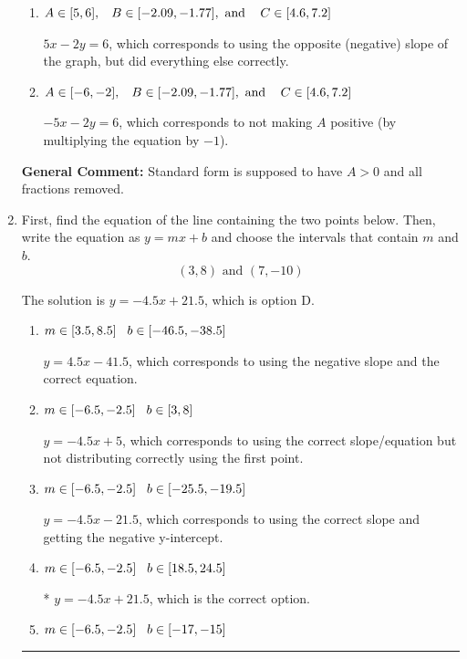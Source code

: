 \documentclass{extbook}[14pt]
\newcommand{\litem}[1]{\item #1

\rule{\textwidth}{0.4pt}}
\begin{document}
\begin{enumerate}
{\begin{enumerate}[label=\Alph*.]
* $5x + 2y = -6$, which is the correct option.
\item \( A \in [5, 6], \hspace{3mm} B \in [-2.09, -1.77], \text{ and } \hspace{3mm} C \in [4.6, 7.2] \)

 $5x - 2y = 6$, which corresponds to using the opposite (negative) slope of the graph, but did everything else correctly.
\item \( A \in [-6, -2], \hspace{3mm} B \in [-2.09, -1.77], \text{ and } \hspace{3mm} C \in [4.6, 7.2] \)

 $-5x - 2y = 6$, which corresponds to not making $A$ positive (by multiplying the equation by $-1$).
\end{enumerate}

\textbf{General Comment:} Standard form is supposed to have $A > 0$ and all fractions removed.
}
\litem{
First, find the equation of the line containing the two points below. Then, write the equation as $ y=mx+b $ and choose the intervals that contain $m$ and $b$.
\[ (3, 8) \text{ and } (7, -10) \]

The solution is \( y = -4.5x + 21.5 \), which is option D.\begin{enumerate}[label=\Alph*.]
\item \( m \in [3.5, 8.5] \hspace*{3mm} b \in [-46.5, -38.5] \)

 $y = 4.5x -41.5$, which corresponds to using the negative slope and the correct equation.
\item \( m \in [-6.5, -2.5] \hspace*{3mm} b \in [3, 8] \)

 $y = -4.5x + 5$, which corresponds to using the correct slope/equation but not distributing correctly using the first point.
\item \( m \in [-6.5, -2.5] \hspace*{3mm} b \in [-25.5, -19.5] \)

 $y = -4.5x -21.5$, which corresponds to using the correct slope and getting the negative y-intercept.
\item \( m \in [-6.5, -2.5] \hspace*{3mm} b \in [18.5, 24.5] \)

* $y = -4.5x + 21.5$, which is the correct option.
\item \( m \in [-6.5, -2.5] \hspace*{3mm} b \in [-17, -15] \)


\end{enumerate}}
\end{enumerate}
\end{document}
